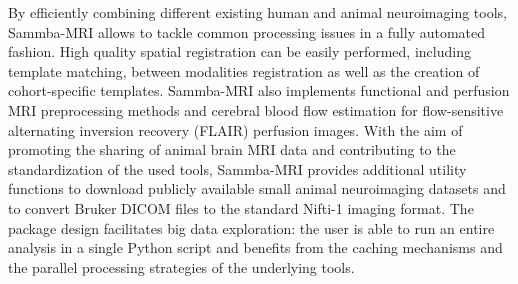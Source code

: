 \documentclass[utf8, a4paper, final, crop]{frontiersSCNS} %
\begin{document}
By efficiently combining different existing human and animal neuroimaging tools, Sammba-MRI
allows to tackle common processing issues in a fully automated fashion. High quality spatial
registration can be easily performed, including template matching, between modalities
registration as well as the creation of cohort-specific templates. Sammba-MRI also implements
functional and perfusion MRI preprocessing methods and cerebral blood flow estimation for
flow-sensitive alternating inversion recovery (FLAIR) perfusion images.
With the aim of promoting the sharing of animal brain MRI data and contributing to the
standardization of the used tools, Sammba-MRI provides additional utility functions to download
publicly available small animal neuroimaging datasets and to convert Bruker DICOM files to
the standard Nifti-1 imaging format.
The package design facilitates big data exploration: the user is able to run an entire analysis in
a single Python script and benefits from the caching mechanisms and the parallel processing
strategies of the underlying tools.
%
\end{document}
